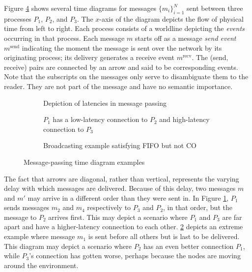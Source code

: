 \documentclass[]             %
{NASA}                       %
\theoremstyle{definition}
\begin{document}
Figure \ref{fig:message-latencies} shows several time diagrams for
messages $\{m_i\}_{i=1}^N$ sent between three processes $P_1$, $P_2$,
and $P_3$. The $x$-axis of the diagram depicts the flow of physical
time from left to right. Each process consists of a worldline
depicting the \emph{events} occurring in that process. Each message
$m$ starts off as a message \emph{send event} $m^\textrm{send}$
indicating the moment the message is sent over the network by its
originating process; its delivery generates a receive event
$m^\textrm{recv}$. The (send, receive) pairs are connected by an arrow
and said to be corresponding events. Note that the subscripts on the
messages only serve to disambiguate them to the reader. They are not
part of the message and have no semantic importance.

\begin{figure}[p]
  \setlength\belowcaptionskip{5ex}

  \begin{subfigure}{1\textwidth}
    \centering
    
    \caption{Depiction of latencies in message passing}
    \label{fig:message-latencies-a}
  \end{subfigure}

  \begin{subfigure}{1\textwidth}
    \centering 
    \caption{$P_1$ has a low-latency connection to $P_2$ and high-latency connection to $P_3$}
    \label{fig:message-latencies-b}
  \end{subfigure}


  \begin{subfigure}{1\textwidth}
    \centering 
    \caption{Broadcasting example satisfying FIFO but not CO}
    \label{fig:message-latencies-c}
  \end{subfigure}

  \caption{Message-passing time diagram examples}
  \label{fig:message-latencies}
\end{figure}

\afterpage{\clearpage}

The fact that arrows are diagonal, rather than vertical, represents
the varying delay with which messages are delivered. Because of this
delay, two messages $m$ and $m'$ may arrive in a different order than
they were sent in. In Figure \ref{fig:message-latencies-a}, $P_1$
sends messages $m_2$ and $m_4$ respectively to $P_3$ and $P_2$, in
that order, but the message to $P_2$ arrives first. This may depict a
scenario where $P_1$ and $P_3$ are far apart and have a higher-latency
connection to each other. \ref{fig:message-latencies-b} depicts an
extreme example where message $m_1$ is sent before all others but is
last to be delivered. This diagram may depict a scenario where $P_2$
has an even better connection $P_1$, while $P_3$'s connection has
gotten worse, perhaps because the nodes are moving around the
environment.
\end{document}
